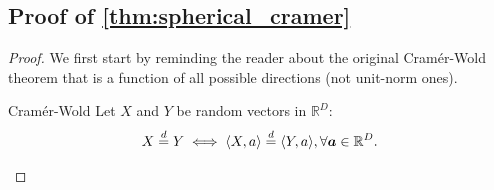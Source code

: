 \subsection{Proof of \cref{thm:spherical_cramer}}
\label{proof:spherical_cramer}
\begin{proof}
We first start by reminding the reader about the original Cramér-Wold theorem that is a function of all possible directions (not unit-norm ones).

\begin{theorem}[label={def:cramer}]{Cramér-Wold \cite{cramer1936some}}{}
Let $X$ and $Y$ be random vectors in $\mathbb{R}^D$:
\begin{align}
    X \overset{d}{=} Y \iff \langle X, a \rangle \overset{d}{=} \langle Y, a \rangle, \forall {\bm{a}} \in \mathbb{R}^D.
\end{align}
\end{theorem}



\end{proof}
